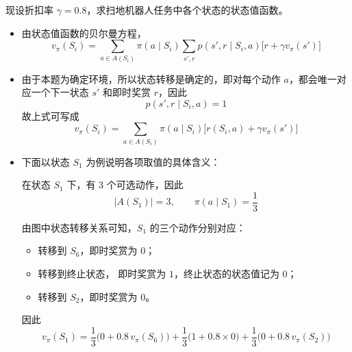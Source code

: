\documentclass[../main.tex]{subfiles}
\begin{document}
\begin{enumerate}
\begin{itemize}
{现设折扣率 $\gamma=0.8$，求扫地机器人任务中各个状态的状态值函数。

\begin{itemize}
    \item 由状态值函数的贝尔曼方程，
    $$
    v_{\pi}(S_i)=\sum_{a\in A(S_i)}\pi(a\mid S_i)\sum_{s',r}p(s',r\mid S_i,a)\big[r+\gamma v_{\pi}(s')\big]
    $$
    
    \item 由于本题为确定环境，所以状态转移是确定的，即对每个动作 $a$，都会唯一对应一个下一状态 $s'$ 和即时奖赏 $r$，因此
    $$
    p(s',r\mid S_i,a)=1
    $$
    故上式可写成
    $$
    v_{\pi}(S_i)=\sum_{a\in A(S_i)}\pi(a\mid S_i)\big[r(S_i,a)+\gamma v_{\pi}(s')\big]
    $$

    \item 下面以状态 $S_1$ 为例说明各项取值的具体含义：

    在状态 $S_1$ 下，有 $3$ 个可选动作，因此
    $$
    |A(S_1)|=3,\qquad \pi(a\mid S_1)=\frac{1}{3}
    $$
    
    由图中状态转移关系可知，$S_1$ 的三个动作分别对应：
    \begin{itemize}
        \item 转移到 $S_6$，即时奖赏为 $0$；
        \item 转移到终止状态， 即时奖赏为 $1$，终止状态的状态值记为 $0$；
        \item 转移到 $S_2$，即时奖赏为 $0$。
    \end{itemize}
    
    因此
    $$
    v_{\pi}(S_1)
    =\frac{1}{3}\bigl(0+0.8\,v_{\pi}(S_6)\bigr)
    +\frac{1}{3}\bigl(1+0.8\times 0\bigr)
    +\frac{1}{3}\bigl(0+0.8\,v_{\pi}(S_2)\bigr)
    $$
    


\end{itemize}}
\end{itemize}
\end{enumerate}
\end{document}
